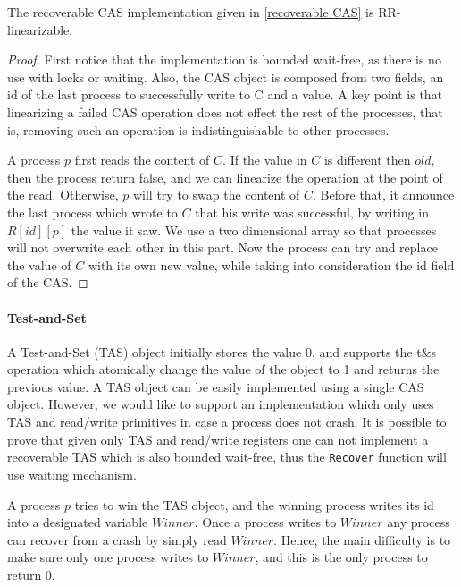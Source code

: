 \begin{claim}
	The recoverable CAS implementation given in \ref{recoverable CAS} is RR-linearizable.
\end{claim}

\begin{proof}
	First notice that the implementation is bounded wait-free, as there is no use with locks or waiting. Also, the CAS object is composed from two fields, an id of the last process to successfully write to C and a value. A key point is that linearizing a failed CAS operation does not effect the rest of the processes, that is, removing such an operation is indistinguishable to other processes.
	
	A process $p$ first reads the content of $C$. If the value in $C$ is different then $old$, then the process return false, and we can linearize the operation at the point of the read. Otherwise, $p$ will try to swap the content of $C$. Before that, it announce the last process which wrote to $C$ that his write was successful, by writing in $R[id][p]$ the value it saw. We use a two dimensional array so that processes will not overwrite each other in this part. Now the process can try and replace the value of $C$ with its own new value, while taking into consideration the id field of the CAS.
	
	 
\end{proof}

\paragraph*{Test-and-Set}

A Test-and-Set (TAS) object initially stores the value 0, and supports the t\&s operation which atomically change the value of the object to 1 and returns the previous value. A TAS object can be easily implemented using a single CAS object. However, we would like to support an implementation which only uses TAS and read/write primitives in case a process does not crash. It is possible to prove that given only TAS and read/write registers one can not implement a recoverable TAS which is also bounded wait-free, thus the \texttt{Recover} function will use waiting mechanism.

A process $p$ tries to win the TAS object, and the winning process writes its id into a designated variable $Winner$. Once a process writes to $Winner$ any process can recover from a crash by simply read $Winner$. Hence, the main difficulty is to make sure only one process writes to $Winner$, and this is the only process to return 0.

